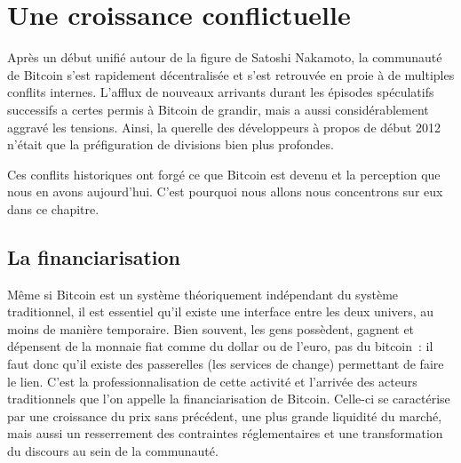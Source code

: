 
\chapter{Une croissance conflictuelle}
\label{ch:conflits}

Après un début unifié autour de la figure de Satoshi Nakamoto, la communauté de Bitcoin s'est rapidement décentralisée et s'est retrouvée en proie à de multiples conflits internes. L'afflux de nouveaux arrivants durant les épisodes spéculatifs successifs a certes permis à Bitcoin de grandir, mais a aussi considérablement aggravé les tensions. Ainsi, la querelle des développeurs à propos de  début 2012 n'était que la préfiguration de divisions bien plus profondes.

Ces conflits historiques ont forgé ce que Bitcoin est devenu et la perception que nous en avons aujourd'hui. C'est pourquoi nous allons nous concentrons sur eux dans ce chapitre.


\section*{La financiarisation} %

Même si Bitcoin est un système théoriquement indépendant du système traditionnel, il est essentiel qu'il existe une interface entre les deux univers, au moins de manière temporaire. Bien souvent, les gens possèdent, gagnent et dépensent de la monnaie fiat comme du dollar ou de l'euro, pas du bitcoin~: il faut donc qu'il existe des passerelles (les services de change) permettant de faire le lien. C'est la professionnalisation de cette activité et l'arrivée des acteurs traditionnels que l'on appelle la financiarisation de Bitcoin. Celle-ci se caractérise par une croissance du prix sans précédent, une plus grande liquidité du marché, mais aussi un resserrement des contraintes réglementaires et une transformation du discours au sein de la communauté.


